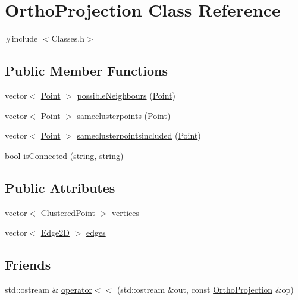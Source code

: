 \hypertarget{class_ortho_projection}{}\section{Ortho\+Projection Class Reference}
\label{class_ortho_projection}


{\ttfamily \#include $<$Classes.\+h$>$}

\subsection*{Public Member Functions}
\begin{DoxyCompactItemize}
\item 
vector$<$ \hyperlink{class_point}{Point} $>$ \hyperlink{class_ortho_projection_a1c40817f0da02d0c1f9ee1c51c142473}{possible\+Neighbours} (\hyperlink{class_point}{Point})
\item 
vector$<$ \hyperlink{class_point}{Point} $>$ \hyperlink{class_ortho_projection_a7011d0bf2d7851c1aecc990f95cb65d7}{sameclusterpoints} (\hyperlink{class_point}{Point})
\item 
vector$<$ \hyperlink{class_point}{Point} $>$ \hyperlink{class_ortho_projection_ae521048f34f0cd5521c889b43c7ee101}{sameclusterpointsincluded} (\hyperlink{class_point}{Point})
\item 
bool \hyperlink{class_ortho_projection_a3ea4e487b02acea5c94814ae3c27e9c4}{is\+Connected} (string, string)
\end{DoxyCompactItemize}
\subsection*{Public Attributes}
\begin{DoxyCompactItemize}
\item 
vector$<$ \hyperlink{class_clustered_point}{Clustered\+Point} $>$ \hyperlink{class_ortho_projection_ada31a302b74c5539788b9f2573c1a0a4}{vertices}
\item 
vector$<$ \hyperlink{class_edge2_d}{Edge2D} $>$ \hyperlink{class_ortho_projection_ae2512ad3cf754d708b2c8976806b4400}{edges}
\end{DoxyCompactItemize}
\subsection*{Friends}
\begin{DoxyCompactItemize}
\item 
std\+::ostream \& \hyperlink{class_ortho_projection_a250fd609c6cbab151eddb3795f794ab5}{operator$<$$<$} (std\+::ostream \&out, const \hyperlink{class_ortho_projection}{Ortho\+Projection} \&op)
\end{DoxyCompactItemize}


